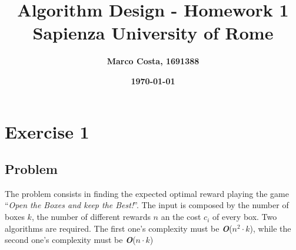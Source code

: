 \documentclass[11pt]{article}
\title{\textbf{Algorithm Design - Homework 1} \\ \bigskip \large \textbf{Sapienza University of Rome}}
\date{\textbf{\today}}
\author{\textbf{Marco Costa, 1691388}}
\begin{document}
\maketitle
\newpage

\section*{Exercise 1}
\subsection*{Problem}
The problem consists in finding the expected optimal reward playing the game ``\textit{Open the Boxes and keep the Best!}''. The input is composed by the number of boxes $k$, the number of different rewards $n$ an
the cost $c_i$ of every box. Two algorithms are required. The first one's complexity must be \textbf{\textit{O}}($n^2 \cdot k$), while the second one's complexity must be \textbf{\textit{O}}($n \cdot k$)
\end{document}
